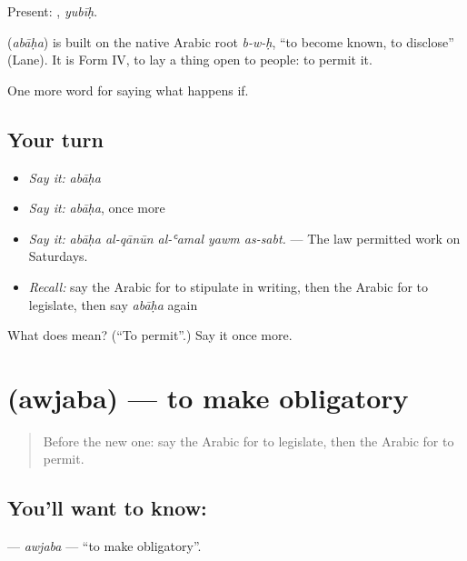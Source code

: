 Present: , \emph{yubīḥ}.

\begin{cousinweb}
\textbf{} (\emph{abāḥa}) is built on the native Arabic root \emph{b-w-ḥ}, \textquotedblleft{}to become known, to disclose\textquotedblright{} (Lane). It is Form IV, to lay a thing open to people: to permit it.
\end{cousinweb}

\begin{grammarlens}[title={What you've built}]
One more word for saying what happens if.
\end{grammarlens}

\subsection*{Your turn}
\begin{itemize}
\raggedright
  \item \emph{Say it:} \emph{abāḥa}
  \item \emph{Say it:} \emph{abāḥa}, once more
  \item \emph{Say it:} \emph{abāḥa al-qānūn al-ʿamal yawm as-sabt.} — The law permitted work on Saturdays.
  \item \emph{Recall:} say the Arabic for to stipulate in writing, then the Arabic for to legislate, then say \emph{abāḥa} again
\end{itemize}

\begin{tcolorbox}[breakable,colback=teal!4,colframe=teal!35!black,title={Before you move on}]
What does  mean? (\textquotedblleft{}To permit\textquotedblright{}.) Say it once more.
\end{tcolorbox}
\section[\texorpdfstring{\ar{أوجب} (awjaba)}{أوجب (awjaba)}]{ (awjaba) — to make obligatory}

\label{lesson:AR-C410-awjaba}



\begin{quote}
Before the new one: say the Arabic for to legislate, then the Arabic for to permit.
\end{quote}

\subsection*{You'll want to know: }
\textbf{} — \emph{awjaba} — \textquotedblleft{}to make obligatory\textquotedblright{}.

